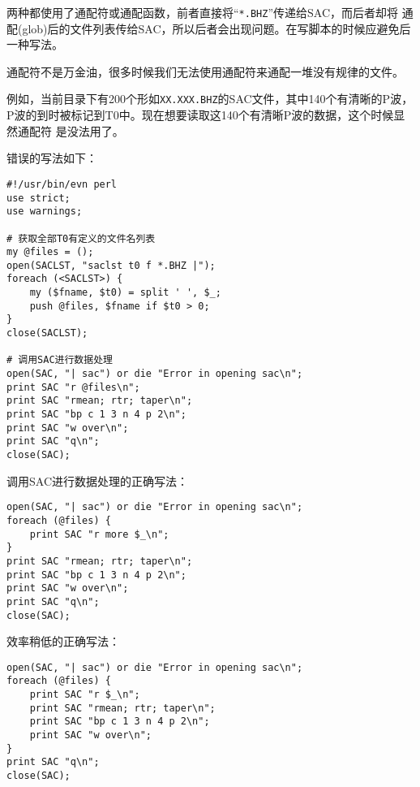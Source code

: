 两种都使用了通配符或通配函数，前者直接将“\verb+*.BHZ+”传递给SAC，而后者却将
通配(glob)后的文件列表传给SAC，所以后者会出现问题。在写脚本的时候应避免后
一种写法。

通配符不是万金油，很多时候我们无法使用通配符来通配一堆没有规律的文件。

例如，当前目录下有200个形如\verb+XX.XXX.BHZ+的SAC文件，其中140个有清晰的P波，
P波的到时被标记到T0中。现在想要读取这140个有清晰P波的数据，这个时候显然通配符
是没法用了。

错误的写法如下：
\begin{verbatim}
#!/usr/bin/evn perl
use strict;
use warnings;

# 获取全部T0有定义的文件名列表
my @files = ();
open(SACLST, "saclst t0 f *.BHZ |");
foreach (<SACLST>) {
    my ($fname, $t0) = split ' ', $_;
    push @files, $fname if $t0 > 0;
}
close(SACLST);

# 调用SAC进行数据处理
open(SAC, "| sac") or die "Error in opening sac\n";
print SAC "r @files\n";
print SAC "rmean; rtr; taper\n";
print SAC "bp c 1 3 n 4 p 2\n";
print SAC "w over\n";
print SAC "q\n";
close(SAC);
\end{verbatim}

调用SAC进行数据处理的正确写法：
\begin{verbatim}
open(SAC, "| sac") or die "Error in opening sac\n";
foreach (@files) {
    print SAC "r more $_\n";
}
print SAC "rmean; rtr; taper\n";
print SAC "bp c 1 3 n 4 p 2\n";
print SAC "w over\n";
print SAC "q\n";
close(SAC);
\end{verbatim}

效率稍低的正确写法：
\begin{verbatim}
open(SAC, "| sac") or die "Error in opening sac\n";
foreach (@files) {
    print SAC "r $_\n";
    print SAC "rmean; rtr; taper\n";
    print SAC "bp c 1 3 n 4 p 2\n";
    print SAC "w over\n";
}
print SAC "q\n";
close(SAC);
\end{verbatim}
